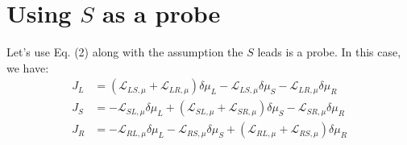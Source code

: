 \section{Using $S$ as a probe}

Let's use Eq. (2) along with the assumption the $S$ leads is a probe. In this case, we have:
\begin{align}\label{JL}
J_{L}&=
(\mathcal{L}_{LS,\mu}+\mathcal{L}_{LR,\mu} )\delta\mu_{L}
-\mathcal{L}_{LS,\mu}\delta\mu_{S}
-\mathcal{L}_{LR,\mu}\delta\mu_{R}
\\\label{JS}
J_{S}&=
-\mathcal{L}_{SL,\mu}\delta\mu_{L}
+
(\mathcal{L}_{SL,\mu}+\mathcal{L}_{SR,\mu})\delta\mu_{S}
-
\mathcal{L}_{SR,\mu}\delta\mu_{R}
\\\label{JR}
J_{R}&= 
-\mathcal{L}_{RL,\mu}\delta\mu_{L} 
-\mathcal{L}_{RS,\mu}\delta\mu_{S}
+
(\mathcal{L}_{RL,\mu}+\mathcal{L}_{RS,\mu})\delta\mu_{R}
\end{align}

